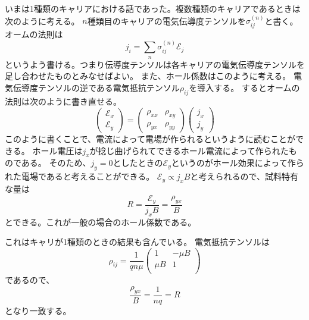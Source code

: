 \documentclass[11pt,dvipdfmx,a4paper]{jsarticle}
\numberwithin{equation}{section}
\begin{document}
いまは1種類のキャリアにおける話であった。複数種類のキャリアであるときは次のように考える。
\(n\)種類目のキャリアの電気伝導度テンソルを\(\sigma_{ij}^{(n)}\)と書く。
オームの法則は
\begin{equation}
	j_i = \sum_n \sigma_{ij}^{(n)}\mathscr{E}_j
\end{equation}
というよう書ける。つまり伝導度テンソルは各キャリアの電気伝導度テンソルを足し合わせたものとみなせばよい。
また、ホール係数はこのように考える。
電気伝導度テンソルの逆である電気抵抗テンソル\(\rho_{ij}\)を導入する。
するとオームの法則は次のように書き直せる。
\begin{equation}
	\begin{pmatrix}
		\mathscr{E}_x\\ \mathscr{E}_y
	\end{pmatrix}
	=
	\begin{pmatrix}
		\rho_{xx} & \rho_{xy}\\
		\rho_{yx} & \rho_{yy}
	\end{pmatrix}
	\begin{pmatrix}
		j_x \\j_y
	\end{pmatrix}
\end{equation}
このように書くことで、電流によって電場が作られるというように読むことができる。
ホール電圧は\(j_x\)が捻じ曲げられてできるホール電流によって作られたものである。
そのため、\(j_y=0\)としたときの\(\mathscr{E}_y\)というのがホール効果によって作られた電場であると考えることができる。
\(\mathscr{E}_y \propto j_x B\)と考えられるので、試料特有な量は
\begin{equation}
	R = \frac{\mathscr{E}_y}{j_x B} = \frac{\rho_{yx}}{B}
\end{equation}
とできる。これが一般の場合のホール係数である。

これはキャリが1種類のときの結果も含んでいる。
電気抵抗テンソルは
\begin{equation}
	\rho_{ij} = \frac{1}{qn\mu}
	\begin{pmatrix}
		1 & -\mu B\\
		\mu B & 1\\
	\end{pmatrix}
\end{equation}
であるので、
\begin{equation}
	\frac{\rho_{yx}}{B} = \frac{1}{nq} = R
\end{equation}
となり一致する。
\end{document}
